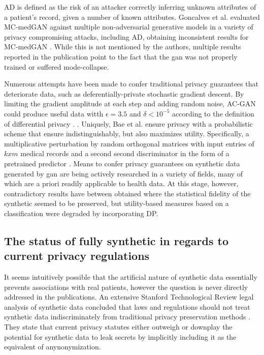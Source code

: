     AD is defined as the risk of an attacker correctly inferring unknown attributes of a patient's record, given a number of known attributes. Goncalves et al. evaluated MC-medGAN against multiple non-adversarial generative models in a variety of privacy compromising attacks, including AD, obtaining inconsistent results for MC-medGAN \cite{Goncalves2020}. While this is not mentioned by the authors, multiple results reported in the publication point to the fact that the \gls{gan} was not properly trained or suffered mode-collapse.\par
    
    Numerous attempts have been made to confer traditional privacy guarantees that deteriorate data, such as deferentially-private stochastic gradient descent. By limiting the gradient amplitude at each step and adding random noise, AC-GAN could produce useful data witth $\epsilon=3.5$ and $\delta<10^{-5}$ according to the definition of differential privacy \cite{Beaulieu-Jones2019-ct, esteban2017real,chincheong2020generation}. \cite{BaeAnomiGAN2020}. Uniquely, Bae et al. ensure privacy with a probabilistic scheme that ensure indistinguishably, but also maximizes utility. Specifically, a multiplicative perturbation by random orthogonal matrices with input entries of $k x m$ medical records and a second second discriminator in the form of a pretrained  predictor \cite{BaeAnomiGAN2020}. Means to confer privacy guarantees on synthetic data generated by \gls{gan} are being actively researched in a variety of fields, many of which are a priori readily applicable to health data. At this stage, however, contradictory results have between obtained where the statistical fidelity of the synthetic seemed to be preserved, but utility-based measures based on a classification were degraded by incorporating DP.\par
    
    \subsection{The status of fully synthetic in regards to current privacy regulations}
        It seems intuitively possible that the artificial nature of synthetic data essentially prevents associations with real patients, however the question is never directly addressed in the publications. An extensive Stanford Technological Review legal analysis of synthetic data concluded that laws and regulations should not treat synthetic data indiscriminately from traditional privacy preservation methods \cite{bellovin2019privacy}. They state that current privacy statutes either outweigh or downplay the potential for synthetic data to leak secrets by implicitly including it as the equivalent of anynonymization. 
    
